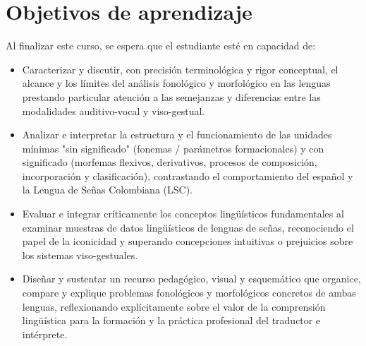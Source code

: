 
%

\section{Objetivos de aprendizaje}

Al finalizar este curso, se espera que el estudiante esté en
capacidad de:

%
\begin{itemize}[
    leftmargin=*,
    itemsep=5pt,
    topsep=4pt
]

\item
Caracterizar y discutir, con precisión terminológica y rigor conceptual, el alcance y los límites del análisis fonológico y morfológico en las lenguas prestando particular atención a las semejanzas y diferencias entre las modalidades auditivo-vocal y viso-gestual.
\item
Analizar e interpretar la estructura y el funcionamiento de las unidades mínimas "sin significado" (fonemas / parámetros formacionales) y con significado (morfemas flexivos, derivativos, procesos de composición, incorporación y clasificación), contrastando el comportamiento del español y la Lengua de Señas Colombiana (LSC).
\item
Evaluar e integrar críticamente los conceptos lingüísticos fundamentales al examinar muestras de datos lingüísticos de lenguas de señas, reconociendo el papel de la iconicidad y superando concepciones intuitivas o prejuicios sobre los sistemas viso-gestuales.
\item
Diseñar y sustentar un recurso pedagógico, visual y esquemático que organice, compare y explique problemas fonológicos y morfológicos concretos de ambas lenguas, reflexionando explícitamente sobre el valor de la comprensión lingüística para la formación y la práctica profesional del traductor e intérprete.
\end{itemize}